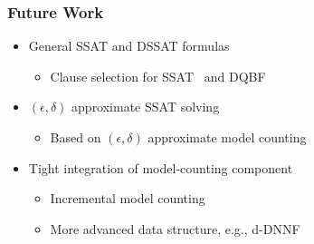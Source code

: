 \begin{frame}
      \frametitle{Future Work}
      \begin{itemize}
            \item General SSAT and DSSAT formulas
                  \pause
                  \begin{itemize}
                        \item Clause selection for SSAT~\cite{Chen2021} and DQBF~\cite{Tentrup2019}
                              \pause
                  \end{itemize}
            \item $(\epsilon,\delta)$ approximate SSAT solving
                  \pause
                  \begin{itemize}
                        \item Based on $(\epsilon,\delta)$ approximate model counting
                              \pause
                  \end{itemize}
            \item Tight integration of model-counting component
                  \pause
                  \begin{itemize}
                        \item Incremental model counting
                              \pause
                        \item More advanced data structure, e.g., d-DNNF~\cite{Darwiche2002dDNNF}
                  \end{itemize}
      \end{itemize}
\end{frame}